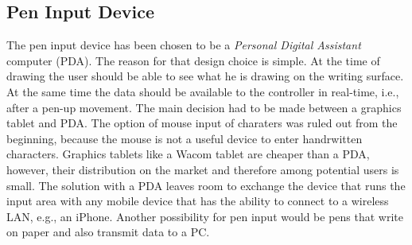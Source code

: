 \subsection{Pen Input Device}
\label{sec:peninputdevice}

The pen input device has been chosen to be a \emph{Personal Digital Assistant} 
computer (PDA). The reason for that design choice is simple. At the time of
drawing the user should be able to see what he is drawing on the writing surface.
At the same time the data should be available to the controller in real-time,
i.e., after a pen-up movement.
The main decision had to be made between a graphics tablet and PDA.
The option of mouse input of charaters was ruled out from the beginning,
because the mouse is not a useful device to enter handrwitten characters.
Graphics tablets like a Wacom tablet are cheaper than a PDA, however,
their distribution on the market and therefore among potential users is small.
The solution with a PDA leaves room to exchange the device that runs the input
area with any mobile device that has the ability to connect to a wireless LAN,
e.g., an iPhone. Another possibility for pen input would be pens that write on paper 
and also transmit data to a PC. 

